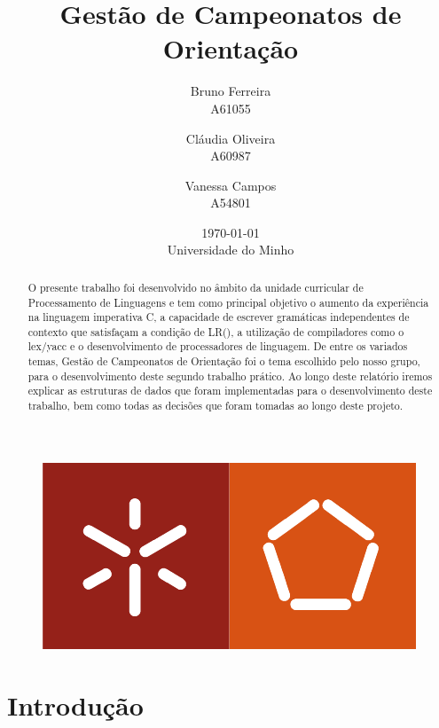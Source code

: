 \documentclass[11pt, a4paper, oneside]{article}
\begin{document}
\title{Gestão de Campeonatos de Orientação}
\date{\today\\Universidade do Minho}
\author{
  Bruno Ferreira\\
  {\small A61055}\\
  \and
  Cláudia Oliveira\\
  {\small A60987}\\
  \and
  Vanessa Campos\\
  {\small A54801}\\
}

\maketitle

\begin{figure}[h]
\begin{center}
\includegraphics[width=0.4\linewidth]{logo}
\end{center}
\end{figure}


\begin{abstract}

  O presente trabalho foi desenvolvido no âmbito da unidade curricular de Processamento de Linguagens e tem como principal objetivo o aumento da experiência na linguagem imperativa \textsf{C}, a capacidade de escrever gramáticas independentes de contexto que satisfaçam a condição de LR(), a utilização de compiladores como o \textsf{lex}/\textsf{yacc} e o desenvolvimento de processadores de linguagem. De entre os variados temas, Gestão de Campeonatos de Orientação foi o tema escolhido pelo nosso grupo, para o desenvolvimento deste segundo trabalho prático. Ao longo deste relatório iremos explicar as estruturas de dados que foram implementadas para o desenvolvimento deste trabalho, bem como todas as decisões que foram tomadas ao longo deste projeto. 

\end{abstract}
\newpage

\tableofcontents

\newpage
\section{Introdução}
\end{document}

